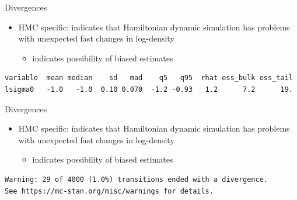 \documentclass[finnish,english,t]{beamer}
\begin{document}
\begin{frame}[fragile]{Divergences}

  \begin{itemize}
  \item HMC specific: indicates that Hamiltonian dynamic simulation
    has problems with unexpected fast changes in log-density
    \begin{itemize}
    \item indicates possibility of biased estimates
    \end{itemize}
  \end{itemize}

     \vspace{-1\baselineskip}
     \footnotesize
\begin{verbatim}
variable  mean median    sd   mad    q5   q95  rhat ess_bulk ess_tail
lsigma0   -1.0   -1.0  0.10 0.070  -1.2 -0.93   1.2      7.2      19.
\end{verbatim}
     
\end{frame}

\begin{frame}[fragile]{Divergences}

  \begin{itemize}
  \item HMC specific: indicates that Hamiltonian dynamic simulation
    has problems with unexpected fast changes in log-density
    \begin{itemize}
    \item indicates possibility of biased estimates
    \end{itemize}
  \end{itemize}
     
     \vspace{-1\baselineskip}
     \footnotesize
\begin{verbatim}
Warning: 29 of 4000 (1.0%) transitions ended with a divergence.
See https://mc-stan.org/misc/warnings for details.
\end{verbatim}
     
\end{frame}
\end{document}
